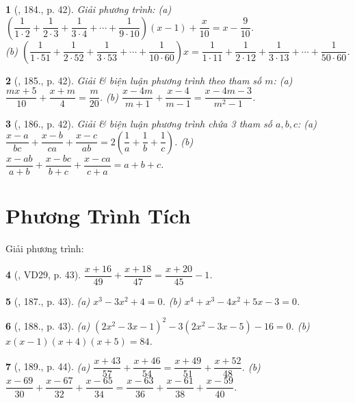 \documentclass{article}
\newtheorem{baitoan}{}
\begin{document}
\begin{baitoan}[\cite{Tuyen_Toan_8}, 184., p. 42]
	Giải phương trình: (a) $\left(\dfrac{1}{1\cdot2} + \dfrac{1}{2\cdot3} + \dfrac{1}{3\cdot4} + \cdots + \dfrac{1}{9\cdot10}\right)(x - 1) + \dfrac{x}{10} = x - \dfrac{9}{10}$.\\(b) $\left(\dfrac{1}{1\cdot51} + \dfrac{1}{2\cdot52} + \dfrac{1}{3\cdot53} + \cdots + \dfrac{1}{10\cdot60}\right)x = \dfrac{1}{1\cdot11} + \dfrac{1}{2\cdot12} + \dfrac{1}{3\cdot13} + \cdots +\dfrac{1}{50\cdot60}$.
\end{baitoan}

\begin{baitoan}[\cite{Tuyen_Toan_8}, 185., p. 42]
	Giải \& biện luận phương trình theo tham số $m$: (a) $\dfrac{mx + 5}{10} + \dfrac{x + m}{4} = \dfrac{m}{20}$. (b) $\dfrac{x - 4m}{m + 1} + \dfrac{x - 4}{m - 1} = \dfrac{x - 4m - 3}{m^2 - 1}$.
\end{baitoan}

\begin{baitoan}[\cite{Tuyen_Toan_8}, 186., p. 42]
	Giải \& biện luận phương trình chứa 3 tham số $a,b,c$: (a) $\dfrac{x - a}{bc} + \dfrac{x - b}{ca} + \dfrac{x - c}{ab} = 2\left(\dfrac{1}{a} + \dfrac{1}{b} + \dfrac{1}{c}\right)$. (b) $\dfrac{x - ab}{a + b} + \dfrac{x - bc}{b + c} + \dfrac{x - ca}{c + a} = a + b + c$.
\end{baitoan}


\section{Phương Trình Tích}
Giải phương trình:

\begin{baitoan}[\cite{Tuyen_Toan_8}, VD29, p. 43]
	$\dfrac{x + 16}{49} + \dfrac{x + 18}{47} = \dfrac{x + 20}{45} - 1$.
\end{baitoan}

\begin{baitoan}[\cite{Tuyen_Toan_8}, 187., p. 43]
	 (a) $x^3 - 3x^2 + 4 = 0$. (b) $x^4 + x^3 - 4x^2 + 5x - 3 = 0$.
\end{baitoan}

\begin{baitoan}[\cite{Tuyen_Toan_8}, 188., p. 43]
	(a) $(2x^2 - 3x - 1)^2 - 3(2x^2 - 3x - 5) - 16 = 0$. (b) $x(x - 1)(x + 4)(x + 5) = 84$.
\end{baitoan}

\begin{baitoan}[\cite{Tuyen_Toan_8}, 189., p. 44]
	(a) $\dfrac{x + 43}{57} + \dfrac{x + 46}{54} = \dfrac{x + 49}{51} + \dfrac{x + 52}{48}$. (b) $\dfrac{x - 69}{30} + \dfrac{x - 67}{32} + \dfrac{x - 65}{34} = \dfrac{x - 63}{36} + \dfrac{x - 61}{38} + \dfrac{x - 59}{40}$.
\end{baitoan}
\end{document}
